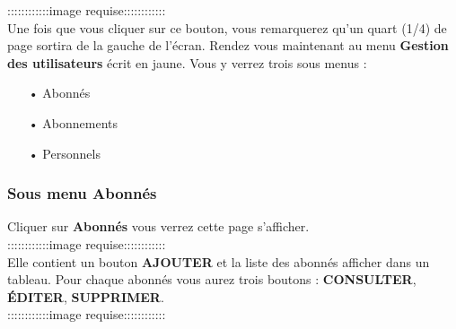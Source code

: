 \documentclass[12pt,a4paper]{article}
\begin{document}
::::::::::::image requise::::::::::::\\

Une fois que vous cliquer sur ce bouton, vous remarquerez qu'un quart (1/4) de page 
sortira de la gauche de l'écran. Rendez vous maintenant au menu \textbf{Gestion des
utilisateurs} écrit en jaune. Vous y verrez trois sous menus :
\begin{itemize}
\item[•] Abonnés
\item[•] Abonnements
\item[•] Personnels
\end{itemize}

\subsubsection{Sous menu \textbf{Abonnés}}
Cliquer sur \textbf{Abonnés} vous verrez cette page s'afficher.\\
::::::::::::image requise::::::::::::\\
Elle contient un bouton \textbf{AJOUTER} et la liste des abonnés afficher dans un tableau.
Pour chaque abonnés vous aurez trois boutons : \textbf{CONSULTER}, \textbf{ÉDITER}, 
\textbf{SUPPRIMER}.\\
::::::::::::image requise::::::::::::\\
\end{document}
